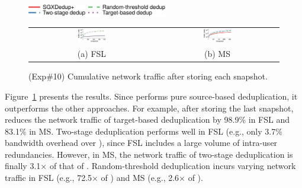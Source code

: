 \begin{figure}[t]
    \centering
    \includegraphics[height=0.2in]{pic/featurespy/plot/bandwidth/upload_traffic_legend.pdf}     \vspace{3pt} \\
    \begin{tabular}{@{\ }c@{\ }c}
        \includegraphics[width=0.23\textwidth]{pic/featurespy/plot/bandwidth/upload_traffic_fsl.pdf} &
        \includegraphics[width=0.23\textwidth]{pic/featurespy/plot/bandwidth/upload_traffic_ms.pdf} \\
        {\small (a) FSL} & {\small (b) MS} \\
    \end{tabular}
    \vspace{-6pt}
    \caption{(Exp\#10) Cumulative network traffic after storing each snapshot.}
    \vspace{-6pt}
    \label{fig:expNetworkTraffic}
\end{figure}


Figure~\ref{fig:expNetworkTraffic} presents the results. Since \prototype performs pure source-based deduplication, it outperforms the other approaches. For example, after storing the last snapshot, \prototype reduces the network traffic of target-based deduplication by 98.9\% in FSL and 83.1\% in MS. Two-stage deduplication performs well in FSL (e.g., only 3.7\% bandwidth overhead over \prototype), since FSL includes a large volume of intra-user redundancies. However, in MS, the network traffic of two-stage deduplication is finally 3.1$\times$ of that of \prototype. Random-threshold deduplication incurs varying network traffic in FSL (e.g., 72.5$\times$ of \prototype) and MS (e.g., 2.6$\times$ of \prototype).


